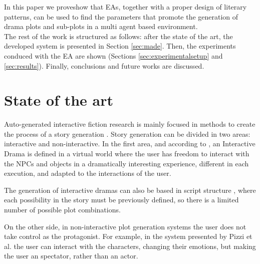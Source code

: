 \documentclass{sig-alternate}
\begin{document}
In this paper we proveshow that EAs, together with a proper design of
literary patterns, can be used to find the parameters that promote the
generation of drama plots and sub-plots in a multi agent based
environment.\\


The rest of the work is structured as follows: after the state of the art, the developed system is presented in Section \ref{sec:made}. Then, the experiments conduced with the EA are shown (Sections \ref{sec:experimentalsetup} and \ref{sec:results}). Finally, conclusions and future works are discussed.


%
%


\section{State of the art}
\label{sec:soa}


Auto-generated interactive fiction research is mainly focused in
methods to create the process of a story generation
\cite{nairat2011character}. Story generation can be divided in two
areas: interactive and non-interactive. In the first area, and
according to \cite{ReviewArinbjarnar09}, an Interactive Drama is
defined in a virtual world where the user has freedom to interact with
the NPCs and objects in a dramatically interesting experience,
different in each execution, and adapted to the interactions of the
user. %

The generation of interactive dramas can also be based in script
structure \cite{ArchitectureYoung04}, where each possibility in the
story must be previously defined, so there is a limited number of
possible plot combinations.

On the other side, in non-interactive plot generation systems the user
does not take control as the protagonist. For example, in the system
presented by Pizzi et al. \cite{pizzi2007interactive} the user can
interact with the characters, changing their emotions, but making the
user an spectator, rather than an actor. %
\end{document}

